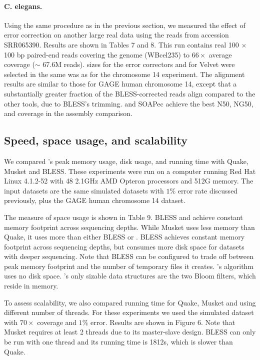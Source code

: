 \documentclass{bmcart}
\begin{document}
\paragraph{C. elegans.}
Using the same procedure as in the previous section, we measured the effect of error correction on another large real data using the reads from accession SRR065390. Results are shown in Tables 7 and 8.  This run contains real 100 $\times$ 100 bp paired-end reads covering the \elegans genome (WBcel235) to $66\times$ average coverage ($\sim$ 67.6M reads).  \kmer sizes for the error correctors and for Velvet were selected in the same was as for the chromosome 14 experiment.  The alignment results are similar to those for GAGE human chromosome 14, except that a substantially greater fraction of the BLESS-corrected reads align compared to the other tools, due to BLESS's trimming.  \tool and SOAPec achieve the best N50, NG50, and coverage in the assembly comparison.

\subsection*{Speed, space usage, and scalability}

We compared \tool's peak memory usage, disk usage, and running time with Quake, Musket and BLESS.  These experiments were run on a computer running Red Hat Linux 4.1.2-52 with 48 2.1GHz AMD Opteron processors and 512G memory.
The input datasets are the same simulated \ecoli datasets with $1\%$ error rate discussed previously, plus the GAGE human chromosome 14 dataset.

The measure of space usage is shown in Table 9. BLESS and \tool achieve constant memory footprint across sequencing depths.  While Musket uses less memory than Quake, it uses more than either BLESS or \tool.  BLESS achieves constant memory footprint across sequencing depths, but consumes more disk space for datasets with deeper sequencing.  Note that BLESS can be configured to trade off between peak memory footprint and the number of temporary files it creates.  \tool's algorithm uses no disk space.  \tool's only sizable data structures are the two Bloom filters, which reside in memory.

To assess scalability, we also compared running time for Quake, Musket and \tool using different number of threads.  For these experiments we used the simulated \ecoli dataset with $70\times$ coverage and $1\%$ error.  Results are shown in Figure 6.  Note that Musket requires at least 2 threads due to its master-slave design.  BLESS can only be run with one thread and its running time is 1812s, which is slower than Quake.
\end{document}
